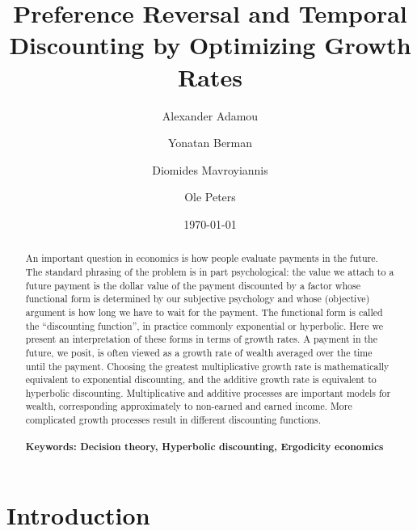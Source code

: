 \documentclass[11pt]{article}
\numberwithin{equation}{section}
\begin{document}
\begin{titlepage}
\title{Preference Reversal and Temporal Discounting by Optimizing Growth Rates}
\author{Alexander Adamou \and Yonatan Berman \and Diomides Mavroyiannis \and Ole Peters}
\date{\today}
\maketitle
\begin{abstract}
\noindent An important question in economics is how people evaluate payments in the future. The standard phrasing of the problem is in part psychological: the value we attach to a future payment is the dollar value of the payment discounted by a factor whose functional form is determined by our subjective psychology and whose (objective) argument is how long we have to wait for the payment. The functional form is called the ``discounting function'', in practice commonly exponential or hyperbolic. Here we present an interpretation of these forms in terms of growth rates. A payment in the future, we posit, is often viewed as a growth rate of wealth averaged over the time until the payment. Choosing the greatest multiplicative growth rate is mathematically equivalent to exponential discounting, and the additive growth rate is equivalent to hyperbolic discounting. Multiplicative and additive processes are important models for wealth, corresponding approximately to non-earned and earned income. More complicated growth processes result in different discounting functions.
\\
\\
\noindent\textbf{Keywords: Decision theory, Hyperbolic discounting, Ergodicity economics}
\\

\bigskip
\end{abstract}
\setcounter{page}{0}
\thispagestyle{empty}
\end{titlepage}
\pagebreak \newpage

\section{Introduction}\label{sec:introduction}
\end{document}
